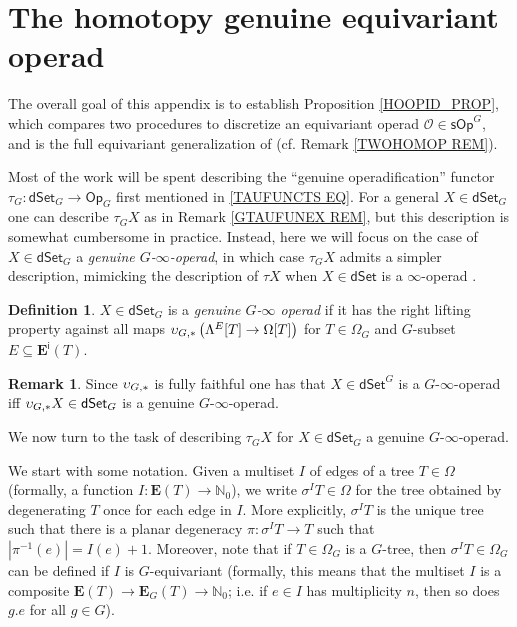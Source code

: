 \documentclass[a4paper,10pt
,draft
]{article}%
\numberwithin{equation}{section}
\numberwithin{figure}{section}
\theoremstyle{definition} %
\newtheorem{definition}[equation]{Definition}%
\newtheorem{remark}[equation]{Remark}%
\renewcommand{\O}{\ensuremath{\mathcal O}}
\newcommand{\1}{\ensuremath{\mathbbm 1}}%
\begin{document}
\section{The homotopy genuine equivariant operad}
\label{HGEO AP}


The overall goal of this appendix is to establish
Proposition \ref{HOOPID_PROP},
which compares two procedures to discretize an
equivariant operad $\O \in \mathsf{sOp}^G$,
and is the full equivariant generalization of
\cite[Prop. 4.8]{CM13b}
(cf. Remark \ref{TWOHOMOP REM}).

Most of the work will be spent 
describing the ``genuine operadification'' functor
$\tau_G \colon \mathsf{dSet}_G \to \mathsf{Op}_G$
first mentioned in
\eqref{TAUFUNCTS EQ}.
For a general $X \in \mathsf{dSet}_G$
one can describe $\tau_G X$
as in Remark \ref{GTAUFUNEX REM},
but this description is somewhat cumbersome in practice.
Instead, here we will focus on the case of
$X \in \mathsf{dSet}_G$
a \emph{genuine $G$-$\infty$-operad}, 
in which case $\tau_G X$
admits a simpler description,
mimicking the description
of $\tau X$ when $X\in \mathsf{dSet}$
is a $\infty$-operad \cite[\S 6]{MW09}.


\begin{definition}
$X \in \mathsf{dSet}_G$
is a \emph{genuine $G$-$\infty$ operad}
if it has the right lifting property against all maps
$\upsilon_{G,\**} 
\left(\Lambda^E[T] \to \Omega[T]\right)$
for $T \in \Omega_G$
and $G$-subset
$E \subseteq \boldsymbol{E}^{\mathsf{i}}(T)$.
\end{definition}

\begin{remark}
	Since $\upsilon_{G,\**}$
	is fully faithful
	one has that 
	$X \in \mathsf{dSet}^G$
	is a $G$-$\infty$-operad
	iff
	$\upsilon_{G,\**}X \in \mathsf{dSet}_G$
	is a genuine $G$-$\infty$-operad.
\end{remark}

We now turn to the task of describing
$\tau_G X$ for $X \in \mathsf{dSet}_G$
a genuine $G$-$\infty$-operad.

We start with some notation. 
Given a multiset $I$ of edges of a tree $T \in \Omega$
(formally, a function 
$I \colon \boldsymbol{E}(T) \to \mathbb{N}_0$),
we write $\sigma^I T \in \Omega$
for the tree obtained by degenerating $T$ once for each edge in $I$.
More explicitly, $\sigma^I T$ is the unique tree such that there is a planar degeneracy
$\pi \colon \sigma^I T \to T$
such that $|\pi^{-1}(e)| = I(e) + 1$.
Moreover,
note that if $T\in \Omega_G$ is a $G$-tree, 
then $\sigma^{I} T \in \Omega_{G}$
can be defined if $I$ is $G$-equivariant
(formally, this means that the multiset $I$ is a composite
$\boldsymbol{E}(T) \to \boldsymbol{E}_G(T)
\to \mathbb{N}_0$;
i.e. if $e \in I$ has multiplicity $n$, then so does $ g.e$ for all $g \in G$).
\end{document}
